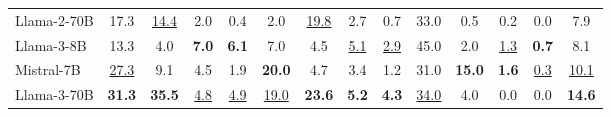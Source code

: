 \begin{table}[tp]
{\begin{tabular}{l|cccc|cccc|cccc|c}
Llama-2-70B &
17.3 & \underline{14.4} & 2.0 & 0.4 & 2.0 & \underline{19.8} & 2.7 & 0.7 & 33.0 & 0.5 & 0.2 & 0.0 & 7.9 \\
Llama-3-8B &
13.3 & 4.0 & \textbf{7.0} & \textbf{6.1} & 7.0 & 4.5 & \underline{5.1} & \underline{2.9} & 45.0 & 2.0 & \underline{1.3} & \textbf{0.7} & 8.1 \\
Mistral-7B &
\underline{27.3} & 9.1 & 4.5 & 1.9 & \textbf{20.0} & 4.7 & 3.4 & 1.2 & 31.0 & \textbf{15.0} & \textbf{1.6} & \underline{0.3} & \underline{10.1} \\
Llama-3-70B &
\textbf{31.3} & \textbf{35.5} & \underline{4.8} & \underline{4.9} & \underline{19.0} & \textbf{23.6} & \textbf{5.2} & \textbf{4.3} & \underline{34.0} & 4.0 & 0.0 & 0.0 & \textbf{14.6} \\
\bottomrule
\end{tabular}}
\end{table}


